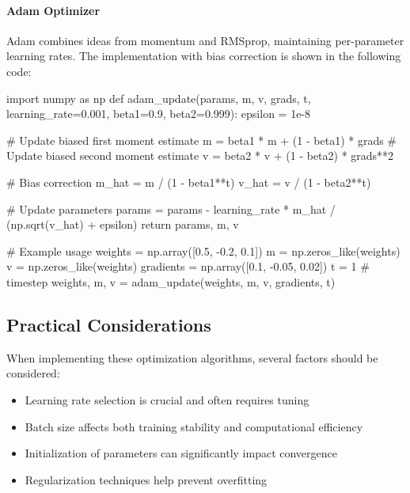 \paragraph{Adam Optimizer}
Adam combines ideas from momentum and RMSprop, maintaining per-parameter learning rates. The implementation with bias correction is shown in the following code:

\begin{pythoncode}
import numpy as np
def adam_update(params, m, v, grads, t, 
                learning_rate=0.001, beta1=0.9, beta2=0.999):
    epsilon = 1e-8
    
    # Update biased first moment estimate
    m = beta1 * m + (1 - beta1) * grads
    # Update biased second moment estimate
    v = beta2 * v + (1 - beta2) * grads**2
    
    # Bias correction
    m_hat = m / (1 - beta1**t)
    v_hat = v / (1 - beta2**t)
    
    # Update parameters
    params = params - learning_rate * m_hat / (np.sqrt(v_hat) + epsilon)
    return params, m, v

# Example usage
weights = np.array([0.5, -0.2, 0.1])
m = np.zeros_like(weights)
v = np.zeros_like(weights)
gradients = np.array([0.1, -0.05, 0.02])
t = 1  # timestep
weights, m, v = adam_update(weights, m, v, gradients, t)
\end{pythoncode}

\subsection{Practical Considerations}

\noindent
When implementing these optimization algorithms, several factors should be considered:

\begin{itemize}[noitemsep]
    \item Learning rate selection is crucial and often requires tuning
    \item Batch size affects both training stability and computational efficiency
    \item Initialization of parameters can significantly impact convergence
    \item Regularization techniques help prevent overfitting
\end{itemize}

